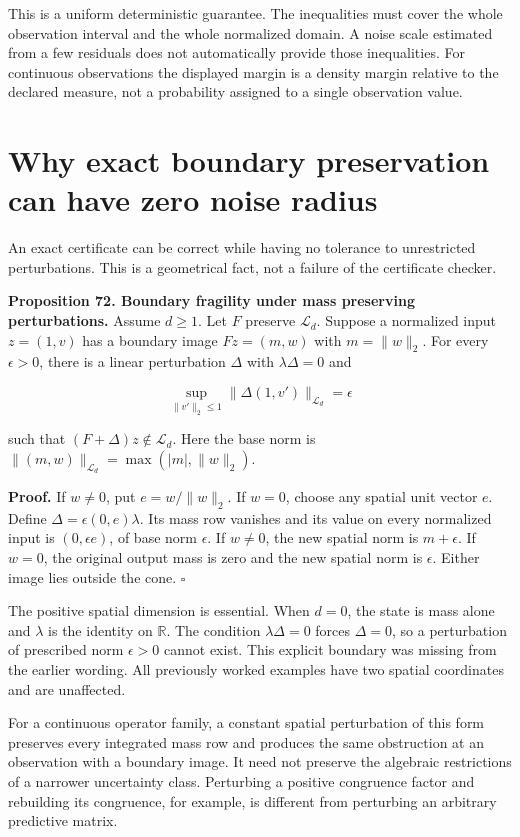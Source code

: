 This is a uniform deterministic guarantee. The inequalities must cover
the whole observation interval and the whole normalized domain. A noise
scale estimated from a few residuals does not automatically provide
those inequalities. For continuous observations the displayed margin is
a density margin relative to the declared measure, not a probability
assigned to a single observation value.

\section{Why exact boundary preservation can have zero noise radius}\label{LSM:why-exact-boundary-preservation-can-have-zero-noise-radius}

An exact certificate can be correct while having no tolerance to
unrestricted perturbations. This is a geometrical fact, not a failure of
the certificate checker.

\textbf{Proposition 72. Boundary fragility under mass preserving
perturbations.} Assume \(d\geq1\). Let \(F\) preserve \(\mathcal L_d\).
Suppose a normalized input \(z=(1,v)\) has a boundary image \(Fz=(m,w)\)
with \(m=\|w\|_2\). For every \(\epsilon>0\), there is a linear
perturbation \(\Delta\) with \(\lambda\Delta=0\) and

\[
\sup_{\|v'\|_2\leq1}\|\Delta(1,v')\|_{\mathcal L_d}=\epsilon
\]

such that \((F+\Delta)z\notin\mathcal L_d\). Here the base norm is
\(\|(m,w)\|_{\mathcal L_d}=\max(|m|,\|w\|_2)\).

\textbf{Proof.} If \(w\ne0\), put \(e=w/\|w\|_2\). If \(w=0\), choose
any spatial unit vector \(e\). Define \(\Delta=\epsilon(0,e)\lambda\).
Its mass row vanishes and its value on every normalized input is
\((0,\epsilon e)\), of base norm \(\epsilon\). If \(w\ne0\), the new
spatial norm is \(m+\epsilon\). If \(w=0\), the original output mass is
zero and the new spatial norm is \(\epsilon\). Either image lies outside
the cone. \(\square\)

The positive spatial dimension is essential. When \(d=0\), the state is
mass alone and \(\lambda\) is the identity on \(\mathbb R\). The
condition \(\lambda\Delta=0\) forces \(\Delta=0\), so a perturbation of
prescribed norm \(\epsilon>0\) cannot exist. This explicit boundary was
missing from the earlier wording. All previously worked examples have
two spatial coordinates and are unaffected.

For a continuous operator family, a constant spatial perturbation of
this form preserves every integrated mass row and produces the same
obstruction at an observation with a boundary image. It need not
preserve the algebraic restrictions of a narrower uncertainty class.
Perturbing a positive congruence factor and rebuilding its congruence,
for example, is different from perturbing an arbitrary predictive
matrix.

